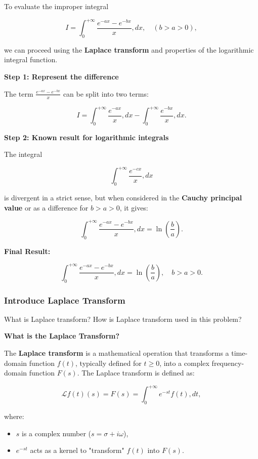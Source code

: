 \documentclass[a4paper,12pt]{book}
\begin{document}
To evaluate the improper integral

\[
I = \int_0^{+\infty} \frac{e^{-ax} - e^{-bx}}{x} , dx, \quad (b > a > 0),
\]

we can proceed using the \textbf{Laplace transform} and properties of the logarithmic integral function.

\textbf{Step 1: Represent the difference}

The term \(\frac{e^{-ax} - e^{-bx}}{x}\) can be split into two terms:

\[
I = \int_0^{+\infty} \frac{e^{-ax}}{x} , dx - \int_0^{+\infty} \frac{e^{-bx}}{x} , dx.
\]

\textbf{Step 2: Known result for logarithmic integrals}

The integral

\[
\int_0^{+\infty} \frac{e^{-cx}}{x} , dx
\]

is divergent in a strict sense, but when considered in the \textbf{Cauchy principal value} or as a difference for \(b > a > 0\), it gives:

\[
\int_0^{+\infty} \frac{e^{-ax} - e^{-bx}}{x} , dx = \ln\left(\frac{b}{a}\right).
\]

\textbf{Final Result:}

\[
\int_0^{+\infty} \frac{e^{-ax} - e^{-bx}}{x} , dx = \ln\left(\frac{b}{a}\right), \quad b > a > 0.
\]

\subsubsection{Introduce Laplace Transform}

\begin{bluebox}
What is Laplace transform? How is Laplace transform used in this problem?
\end{bluebox}

\textbf{What is the Laplace Transform?}

The \textbf{Laplace transform} is a mathematical operation that transforms a time-domain function \( f(t) \), typically defined for \( t \geq 0 \), into a complex frequency-domain function \( F(s) \). The Laplace transform is defined as:

\[
\mathcal{L}{f(t)}(s) = F(s) = \int_0^{+\infty} e^{-st} f(t) , dt,
\]

where:
\begin{itemize}
\item 
\( s \) is a complex number (\( s = \sigma + i\omega \)),

\item 
\( e^{-st} \) acts as a kernel to "transform" \( f(t) \) into \( F(s) \).

\end{itemize}
\end{document}
